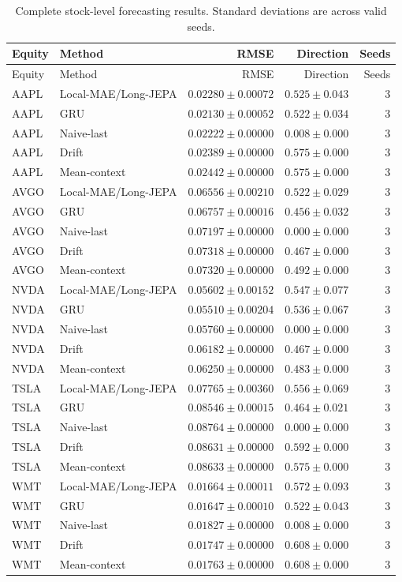 \begin{longtable}{llrrr}
\caption{Complete stock-level forecasting results. Standard deviations are across valid seeds.}\label{tab:appendix_stock_metrics}\\
\toprule
Equity & Method & RMSE & Direction & Seeds \\
\midrule
\endfirsthead
\toprule
Equity & Method & RMSE & Direction & Seeds \\
\midrule
\endhead
AAPL & Local-MAE/Long-JEPA & $0.02280 \pm 0.00072$ & $0.525 \pm 0.043$ & 3 \\
AAPL & GRU & $0.02130 \pm 0.00052$ & $0.522 \pm 0.034$ & 3 \\
AAPL & Naive-last & $0.02222 \pm 0.00000$ & $0.008 \pm 0.000$ & 3 \\
AAPL & Drift & $0.02389 \pm 0.00000$ & $0.575 \pm 0.000$ & 3 \\
AAPL & Mean-context & $0.02442 \pm 0.00000$ & $0.575 \pm 0.000$ & 3 \\
AVGO & Local-MAE/Long-JEPA & $0.06556 \pm 0.00210$ & $0.522 \pm 0.029$ & 3 \\
AVGO & GRU & $0.06757 \pm 0.00016$ & $0.456 \pm 0.032$ & 3 \\
AVGO & Naive-last & $0.07197 \pm 0.00000$ & $0.000 \pm 0.000$ & 3 \\
AVGO & Drift & $0.07318 \pm 0.00000$ & $0.467 \pm 0.000$ & 3 \\
AVGO & Mean-context & $0.07320 \pm 0.00000$ & $0.492 \pm 0.000$ & 3 \\
NVDA & Local-MAE/Long-JEPA & $0.05602 \pm 0.00152$ & $0.547 \pm 0.077$ & 3 \\
NVDA & GRU & $0.05510 \pm 0.00204$ & $0.536 \pm 0.067$ & 3 \\
NVDA & Naive-last & $0.05760 \pm 0.00000$ & $0.000 \pm 0.000$ & 3 \\
NVDA & Drift & $0.06182 \pm 0.00000$ & $0.467 \pm 0.000$ & 3 \\
NVDA & Mean-context & $0.06250 \pm 0.00000$ & $0.483 \pm 0.000$ & 3 \\
TSLA & Local-MAE/Long-JEPA & $0.07765 \pm 0.00360$ & $0.556 \pm 0.069$ & 3 \\
TSLA & GRU & $0.08546 \pm 0.00015$ & $0.464 \pm 0.021$ & 3 \\
TSLA & Naive-last & $0.08764 \pm 0.00000$ & $0.000 \pm 0.000$ & 3 \\
TSLA & Drift & $0.08631 \pm 0.00000$ & $0.592 \pm 0.000$ & 3 \\
TSLA & Mean-context & $0.08633 \pm 0.00000$ & $0.575 \pm 0.000$ & 3 \\
WMT & Local-MAE/Long-JEPA & $0.01664 \pm 0.00011$ & $0.572 \pm 0.093$ & 3 \\
WMT & GRU & $0.01647 \pm 0.00010$ & $0.522 \pm 0.043$ & 3 \\
WMT & Naive-last & $0.01827 \pm 0.00000$ & $0.008 \pm 0.000$ & 3 \\
WMT & Drift & $0.01747 \pm 0.00000$ & $0.608 \pm 0.000$ & 3 \\
WMT & Mean-context & $0.01763 \pm 0.00000$ & $0.608 \pm 0.000$ & 3 \\
\bottomrule
\end{longtable}
